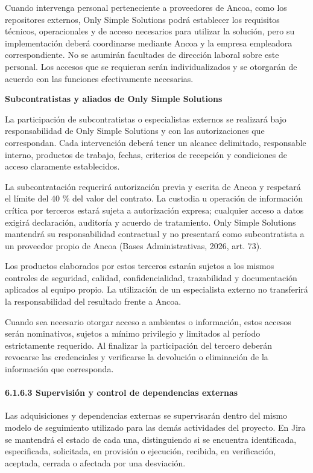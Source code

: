 \documentclass[11pt]{article}
\begin{document}
Cuando intervenga personal perteneciente a proveedores de Ancoa, como
los repositores externos, Only Simple Solutions podrá establecer los
requisitos técnicos, operacionales y de acceso necesarios para utilizar
la solución, pero su implementación deberá coordinarse mediante Ancoa y
la empresa empleadora correspondiente. No se asumirán facultades de
dirección laboral sobre este personal. Los accesos que se requieran
serán individualizados y se otorgarán de acuerdo con las funciones
efectivamente necesarias.

\textbf{Subcontratistas y aliados de Only Simple Solutions}

La participación de subcontratistas o especialistas externos se
realizará bajo responsabilidad de Only Simple Solutions y con las
autorizaciones que correspondan. Cada intervención deberá tener un
alcance delimitado, responsable interno, productos de trabajo, fechas,
criterios de recepción y condiciones de acceso claramente establecidos.

La subcontratación requerirá autorización previa y escrita de Ancoa y
respetará el límite del 40 \% del valor del contrato. La custodia u
operación de información crítica por terceros estará sujeta a
autorización expresa; cualquier acceso a datos exigirá declaración,
auditoría y acuerdo de tratamiento. Only Simple Solutions mantendrá su
responsabilidad contractual y no presentará como subcontratista a un
  proveedor propio de Ancoa (Bases Administrativas, 2026, art. 73).

Los productos elaborados por estos terceros estarán sujetos a los mismos
controles de seguridad, calidad, confidencialidad, trazabilidad y
documentación aplicados al equipo propio. La utilización de un
especialista externo no transferirá la responsabilidad del resultado
frente a Ancoa.

Cuando sea necesario otorgar acceso a ambientes o información, estos
accesos serán nominativos, sujetos a mínimo privilegio y limitados al
período estrictamente requerido. Al finalizar la participación del
tercero deberán revocarse las credenciales y verificarse la devolución o
eliminación de la información que corresponda.

\paragraph{6.1.6.3 Supervisión y control de dependencias externas}\label{6-1-6-3-supervision-y-control-de-dependencias-externas}

Las adquisiciones y dependencias externas se supervisarán dentro del mismo modelo de seguimiento utilizado para las demás actividades del proyecto. En Jira se mantendrá el estado de cada una, distinguiendo si se encuentra identificada, especificada, solicitada, en provisión o ejecución, recibida, en verificación, aceptada, cerrada o afectada por una desviación.
\end{document}
